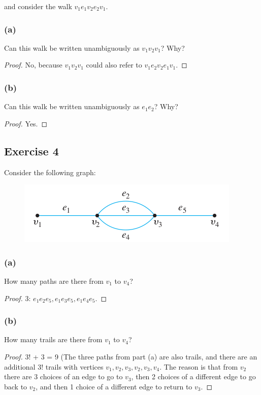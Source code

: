 \documentclass[14pt]{extarticle}
\begin{document}
and consider the walk \(v_1e_1v_2e_2v_1\).

\subsubsection{(a)}
Can this walk be written unambiguously as \(v_1v_2v_1\)? Why?
\begin{proof}
No, because \(v_1v_2v_1\) could also refer to \(v_1e_2v_2e_1v_1\).
\end{proof}

\subsubsection{(b)}
Can this walk be written unambiguously as \(e_1e_2\)? Why?
\begin{proof}
Yes.
\end{proof}

\subsection{Exercise 4}
Consider the following graph:

\begin{figure}[ht!]
\centering
\includegraphics[scale=0.5]{../images/10.1.4.png}
\end{figure}

\subsubsection{(a)}
How many paths are there from \(v_1\) to \(v_4\)?
\begin{proof}
3: \(e_1e_2e_5, e_1e_3e_5, e_1e_4e_5\).
\end{proof}

\subsubsection{(b)}
How many trails are there from \(v_1\) to \(v_4\)?
\begin{proof}
3! + 3 = 9 (The three paths from part (a) are also trails, and there are an additional 3! trails with vertices \(v_1, v_2, 
v_3, v_2, v_3, v_4\). The reason is that from \(v_2\) there are 3 choices of an edge to go to \(v_3\), then 2 choices of a 
different edge to go back to \(v_2\), and then 1 choice of a different edge to return to \(v_3\).
\end{proof}
\end{document}
